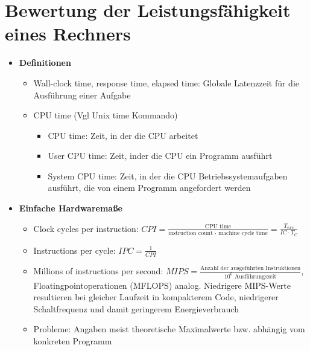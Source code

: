 \section{Bewertung der Leistungsfähigkeit eines Rechners}
\begin{itemize}
	\item \textbf{Definitionen}
	\begin{itemize}
		\item Wall-clock time, response time, elapsed time: Globale Latenzzeit für die Ausführung einer Aufgabe
		\item CPU time (Vgl Unix time Kommando)
		\begin{itemize}
			\item CPU time: Zeit, in der die CPU arbeitet
			\item User CPU time: Zeit, inder die CPU ein Programm ausführt
			\item System CPU time: Zeit, in der die CPU Betriebssystemaufgaben ausführt, die von einem Programm angefordert werden
		\end{itemize}
	\end{itemize}
	\item \textbf{Einfache Hardwaremaße}
	\begin{itemize}
		\item Clock cycles per instruction: \(CPI = \frac{\text{CPU time}}{\text{instruction count } \cdot \text{ machine cycle time}} = \frac{T_{exe}}{IC \cdot T_C}\)
		\item Instructions per cycle: \(IPC = \frac{1}{CPI}\)
		\item Millions of instructions per second: \(MIPS = \frac{\text{Anzahl der ausgeführten Instruktionen}}{10^6 \text{ Ausführungszeit}}\), Floatingpointoperationen (MFLOPS) analog. Niedrigere MIPS-Werte resultieren bei gleicher Laufzeit in kompakterem Code, niedrigerer Schaltfrequenz und damit geringerem Energieverbrauch
		\item Probleme: Angaben meist theoretische Maximalwerte bzw. abhängig vom konkreten Programm 
	\end{itemize}
\end{itemize}

